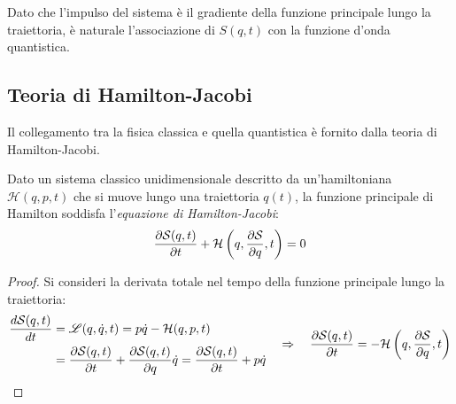 Dato che l'impulso del sistema è il gradiente della funzione principale lungo la traiettoria, è naturale l'associazione di $ S(q,t) $ con la funzione d'onda quantistica.

\subsection{Teoria di Hamilton-Jacobi}

Il collegamento tra la fisica classica e quella quantistica è fornito dalla teoria di Hamilton-Jacobi.

\begin{theorem}
	Dato un sistema classico unidimensionale descritto da un'hamiltoniana $ \mathcal{H}(q,p,t) $ che si muove lungo una traiettoria $ q(t) $, la funzione principale di Hamilton soddisfa l'\textit{equazione di Hamilton-Jacobi}:
	\begin{equation}
		\frac{\partial \mathcal{S}(q,t)}{\partial t} + \mathcal{H} \left( q, \frac{\partial \mathcal{S}}{\partial q}, t \right) = 0
		\label{eq:4.6}
	\end{equation}
\end{theorem}
\begin{proof}
	Si consideri la derivata totale nel tempo della funzione principale lungo la traiettoria:
	\begin{equation*}
		\begin{split}
			\frac{d \mathcal{S}(q,t)}{dt}
			&= \mathscr{L}(q,\dot{q},t) = p \dot{q} - \mathcal{H}(q,p,t) \\
			&= \frac{\partial \mathcal{S}(q,t)}{\partial t} + \frac{\partial \mathcal{S}(q,t)}{\partial q} \dot{q} = \frac{\partial \mathcal{S}(q,t)}{\partial t} + p \dot{q}
		\end{split}
		\quad \Rightarrow \quad
		\frac{\partial \mathcal{S}(q,t)}{\partial t} = - \mathcal{H} \left( q, \frac{\partial \mathcal{S}}{\partial q}, t \right)
	\end{equation*}
\end{proof}

